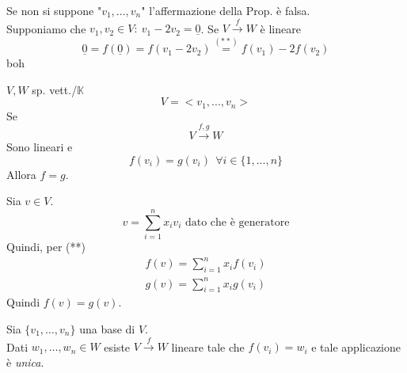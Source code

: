 \begin{osservazione}[]
    Se non si suppone "$v_1,...,v_n$" l'affermazione della Prop. è falsa.\\
    Supponiamo che $v_1,v_2\in V:\ v_1-2v_2=\underline{0}$. Se $V\xrightarrow{f} W$ è lineare
    \begin{equation}
        \underline{0}=f(\underline{0})=f(v_1-2v_2)\overset{(**)}{=}f(v_1)-2f(v_2)
    \end{equation}
    boh
\end{osservazione}
\begin{proposizione}
    $V,W$ sp. vett./$\mathbb{K}$\\
    \begin{equation}
        V=<v_1,...,v_n>
    \end{equation}
    Se
    \begin{equation}
        V\xrightarrow{f,g} W
    \end{equation}
    Sono lineari e
    \begin{equation}
        f(v_i)=g(v_i)\ \ \forall i\in\{1,...,n\}
    \end{equation}
    Allora $f=g$.
\end{proposizione}
\begin{dimostrazione}[]
    Sia $v\in V$. \\
    \begin{equation}
        v=\sum_{i=1}^{n}x_iv_i \text{ dato che è generatore}
    \end{equation}
    Quindi, per (**)
    \begin{gather}
        f(v)=\sum_{i=1}^{n}x_if(v_i) \\
        g(v)=\sum_{i=1}^{n}x_ig(v_i)
    \end{gather}
    Quindi $f(v)=g(v)$.
\end{dimostrazione}
\begin{corollario}
    Sia $\{v_1,\dots,v_n\}$ una base di $V$. \\
    Dati $w_1,\dots,w_n\in W$ esiste $V\xrightarrow{f} W$ lineare tale che $f(v_i)=w_i$ e tale applicazione è \textit{unica}.
\end{corollario}
